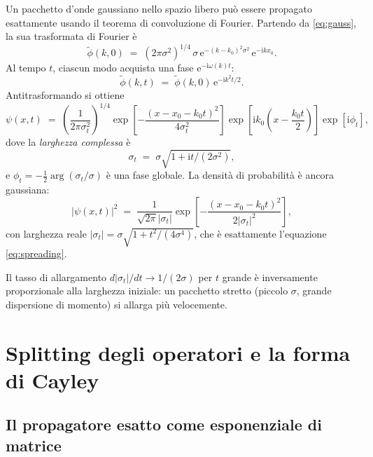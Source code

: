 \documentclass[12pt, a4paper]{article}
\newcommand{\ii}{\mathrm{i}}          %
\newcommand{\ee}{\mathrm{e}}          %
\begin{document}
Un pacchetto d'onde gaussiano nello spazio libero può essere propagato
esattamente usando il teorema di convoluzione di Fourier. Partendo da
\eqref{eq:gauss}, la sua trasformata di Fourier è
\begin{equation}
  \tilde{\phi}(k,0) \;=\;
  (2\pi\sigma^2)^{1/4}\,\sigma\,\ee^{-(k-k_0)^2\sigma^2}\,\ee^{-\ii k x_0}.
\end{equation}
Al tempo $t$, ciascun modo acquista una fase $\ee^{-\ii\omega(k)t}$:
\begin{equation}
  \tilde{\phi}(k,t) \;=\; \tilde{\phi}(k,0)\,\ee^{-\ii k^2 t/2}.
\end{equation}
Antitrasformando si ottiene
\begin{equation}
  \psi(x,t) \;=\;
  \left(\frac{1}{2\pi\sigma_t^2}\right)^{1/4}
  \exp\!\left[-\frac{(x - x_0 - k_0 t)^2}{4\sigma_t^2}\right]
  \exp\!\left[\ii k_0\!\left(x - \frac{k_0 t}{2}\right)\right]
  \exp\!\left[\ii\phi_t\right],
  \label{eq:free_packet}
\end{equation}
dove la \emph{larghezza complessa} è
\begin{equation}
  \sigma_t \;=\; \sigma\sqrt{1 + \ii t/(2\sigma^2)},
\end{equation}
e $\phi_t = -\frac{1}{2}\arg(\sigma_t/\sigma)$ è una fase globale.
La densità di probabilità è ancora gaussiana:
\begin{equation}
  |\psi(x,t)|^2 \;=\;
  \frac{1}{\sqrt{2\pi}|\sigma_t|}
  \exp\!\left[-\frac{(x-x_0-k_0 t)^2}{2|\sigma_t|^2}\right],
\end{equation}
con larghezza reale $|\sigma_t| = \sigma\sqrt{1 + t^2/(4\sigma^4)}$,
che è esattamente l'equazione \eqref{eq:spreading}.

Il tasso di allargamento $d|\sigma_t|/dt \to 1/(2\sigma)$ per $t$ grande
è inversamente proporzionale alla larghezza iniziale: un pacchetto stretto
(piccolo $\sigma$, grande dispersione di momento) si allarga più velocemente.

\section{Splitting degli operatori e la forma di Cayley}
\label{app:splitting}

\subsection{Il propagatore esatto come esponenziale di matrice}
\end{document}
